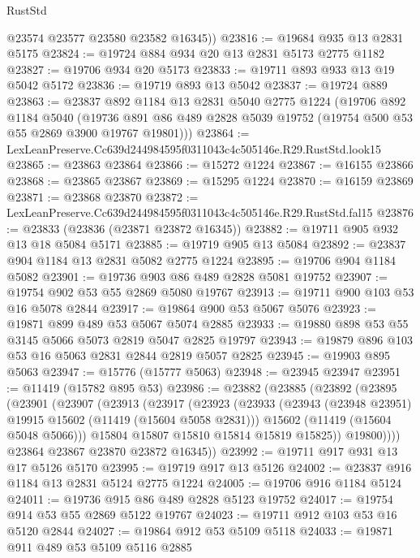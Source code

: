 \begin{lexlean}{RustStd}
\begin{coremodule}
        @23574
        @23577
        @23580
        @23582
        @16345))
@23816 := @19684 @935 @13 @2831 @5175
@23824 := @19724 @884 @934 @20 @13 @2831 @5173 @2775 @1182
@23827 := @19706 @934 @20 @5173
@23833 := @19711 @893 @933 @13 @19 @5042 @5172
@23836 := @19719 @893 @13 @5042
@23837 := @19724 @889
@23863 := @23837
    @892
    @1184
    @13
    @2831
    @5040
    @2775
    @1224
    (@19706
      @892
      @1184
      @5040
      (@19736 @891 @86 @489 @2828 @5039 @19752 (@19754 @500 @53 @55 @2869 @3900 @19767 @19801)))
@23864 := LexLeanPreserve.Cc639d244984595f0311043c4c505146e.R29.RustStd.look15
@23865 := @23863 @23864
@23866 := @15272 @1224
@23867 := @16155 @23866
@23868 := @23865 @23867
@23869 := @15295 @1224
@23870 := @16159 @23869
@23871 := @23868 @23870
@23872 := LexLeanPreserve.Cc639d244984595f0311043c4c505146e.R29.RustStd.fal15
@23876 := @23833 (@23836 (@23871 @23872 @16345))
@23882 := @19711 @905 @932 @13 @18 @5084 @5171
@23885 := @19719 @905 @13 @5084
@23892 := @23837 @904 @1184 @13 @2831 @5082 @2775 @1224
@23895 := @19706 @904 @1184 @5082
@23901 := @19736 @903 @86 @489 @2828 @5081 @19752
@23907 := @19754 @902 @53 @55 @2869 @5080 @19767
@23913 := @19711 @900 @103 @53 @16 @5078 @2844
@23917 := @19864 @900 @53 @5067 @5076
@23923 := @19871 @899 @489 @53 @5067 @5074 @2885
@23933 := @19880 @898 @53 @55 @3145 @5066 @5073 @2819 @5047 @2825 @19797
@23943 := @19879 @896 @103 @53 @16 @5063 @2831 @2844 @2819 @5057 @2825
@23945 := @19903 @895 @5063
@23947 := @15776 (@15777 @5063)
@23948 := @23945 @23947
@23951 := @11419 (@15782 @895 @53)
@23986 := @23882
    (@23885
      (@23892
        (@23895
          (@23901
            (@23907
              (@23913
                (@23917
                  (@23923
                    (@23933
                      (@23943 (@23948 @23951) @19915 @15602 (@11419 (@15604 @5058 @2831)))
                      @15602
                      (@11419 (@15604 @5048 @5066)))
                    @15804
                    @15807
                    @15810
                    @15814
                    @15819
                    @15825))
                @19800))))
        @23864
        @23867
        @23870
        @23872
        @16345))
@23992 := @19711 @917 @931 @13 @17 @5126 @5170
@23995 := @19719 @917 @13 @5126
@24002 := @23837 @916 @1184 @13 @2831 @5124 @2775 @1224
@24005 := @19706 @916 @1184 @5124
@24011 := @19736 @915 @86 @489 @2828 @5123 @19752
@24017 := @19754 @914 @53 @55 @2869 @5122 @19767
@24023 := @19711 @912 @103 @53 @16 @5120 @2844
@24027 := @19864 @912 @53 @5109 @5118
@24033 := @19871 @911 @489 @53 @5109 @5116 @2885

\end{coremodule}
\end{lexlean}
